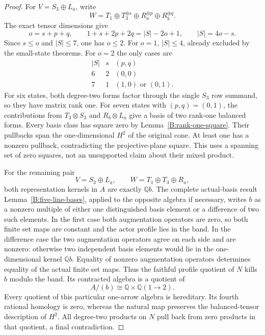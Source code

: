\begin{proof}
For $V=S_3\oplus L_a$, write
\[
 W=T_1\oplus T_3^{\oplus s}
       \oplus R_a^{\oplus p}\oplus R_b^{\oplus q}.
\]
The exact tensor dimensions give
\[
 o=s+p+q,\qquad
 1+s+2p+2q=|S|-2o+1,
 \qquad |S|=4o-s.
\]
Since $s\leq o$ and $|S|\leq7$, one has $o\leq2$.
For $o=1$, $|S|\leq4$, already excluded by the small-state
theorems.  For $o=2$ the only cases are
\[
 \begin{array}{c|c|c}
 |S|&s&(p,q)\\ \hline
 6&2&(0,0)\\
 7&1&(1,0)\text{ or }(0,1).
 \end{array}
\]
For six states, both degree-two forms factor through the
single $S_3$ row summand, so they have matrix rank one.
For seven states with $(p,q)=(0,1)$, the contributions from
$T_3\otimes S_3$ and $R_b\otimes L_a$ give a basis of two
rank-one balanced forms.  Every basis class has square zero
by Lemma~\ref{B:rank-one-square}.
Their pullbacks span the one-dimensional $H^2$ of the original
cone.  At least one has a nonzero pullback, contradicting the
projective-plane square.  This uses a spanning set of zero
squares, not an unsupported claim about their mixed product.

For the remaining pair
\[
 V=S_3\oplus L_a,
 \qquad W=T_1\oplus T_3\oplus R_a,
\]
both representation kernels in $A$ are exactly $\mathbb Qb$.
The complete actual-basis result
Lemma~\ref{B:five-line-bases}, applied to the opposite algebra
if necessary, writes $b$ as a nonzero multiple of either one
distinguished basis element or a difference of two such elements.
In the first case both augmentation operators are zero, so
both finite set maps are constant and the actor profile lies
in the band.  In the difference case the two augmentation
operators agree on each side and are nonzero: otherwise two
independent basis elements would lie in the one-dimensional
kernel $\mathbb Qb$.  Equality of nonzero augmentation
operators determines equality of the actual finite set maps.
Thus the faithful profile quotient of $N$ kills $b$ modulo
the band.  Its contracted algebra is a quotient of
\[
 A/(b)\cong\mathbb Q\times\mathbb Q(1\longrightarrow2).
\]
Every quotient of this particular one-arrow algebra is
hereditary.  Its fourth rational homology is zero, whereas
the natural map preserves the balanced-tensor description
of $H^2$.  All degree-two products on $N$ pull back from
zero products in that quotient, a final contradiction.
\end{proof}

